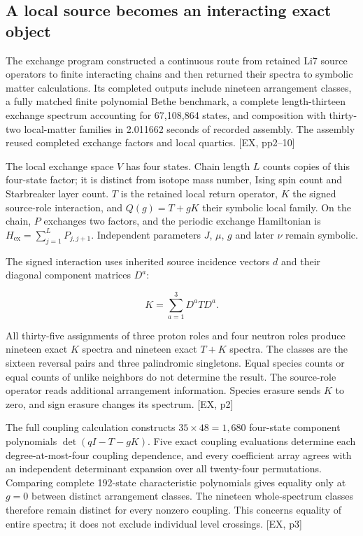 \label{exact-exchange-and-symbolic-matter}

\subsection{A local source becomes an interacting exact object}\label{a-local-source-becomes-an-interacting-exact-object}

The exchange program constructed a continuous route from retained Li7 source operators to finite interacting chains and then returned their spectra to symbolic matter calculations. Its completed outputs include nineteen arrangement classes, a fully matched finite polynomial Bethe benchmark, a complete length-thirteen exchange spectrum accounting for 67,108,864 states, and composition with thirty-two local-matter families in 2.011662 seconds of recorded assembly. The assembly reused completed exchange factors and local quartics. {[}EX, pp2--10{]}

The local exchange space \(V\) has four states. Chain length \(L\) counts copies of this four-state factor; it is distinct from isotope mass number, Ising spin count and Starbreaker layer count. \(T\) is the retained local return operator, \(K\) the signed source-role interaction, and \(Q(g)=T+gK\) their symbolic local family. On the chain, \(P\) exchanges two factors, and the periodic exchange Hamiltonian is \(H_{\mathrm{ex}}=\sum_{j=1}^L P_{j,j+1}\). Independent parameters \(J\), \(\mu\), \(g\) and later \(\nu\) remain symbolic.

The signed interaction uses inherited source incidence vectors \(d\) and their diagonal component matrices \(D^a\):

\[
K=\sum_{a=1}^{3}D^aTD^a.
\]

All thirty-five assignments of three proton roles and four neutron roles produce nineteen exact \(K\) spectra and nineteen exact \(T+K\) spectra. The classes are the sixteen reversal pairs and three palindromic singletons. Equal species counts or equal counts of unlike neighbors do not determine the result. The source-role operator reads additional arrangement information. Species erasure sends \(K\) to zero, and sign erasure changes its spectrum. {[}EX, p2{]}

The full coupling calculation constructs \(35\times48=1{,}680\) four-state component polynomials \(\det(qI-T-gK)\). Five exact coupling evaluations determine each degree-at-most-four coupling dependence, and every coefficient array agrees with an independent determinant expansion over all twenty-four permutations. Comparing complete 192-state characteristic polynomials gives equality only at \(g=0\) between distinct arrangement classes. The nineteen whole-spectrum classes therefore remain distinct for every nonzero coupling. This concerns equality of entire spectra; it does not exclude individual level crossings. {[}EX, p3{]}

